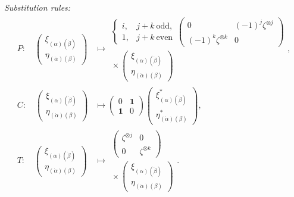 \emph{Substitution rules:}
\begin{equation}
\begin{aligned}
  \scriptstyle
  P:\quad
  \begin{pmatrix}
    \xi_{(\alpha)(\dot\beta)}\\
    \eta_{(\dot\alpha)(\beta)}
  \end{pmatrix}
  &\longmapsto
  \begin{gathered}
    \begin{cases}
      i,&j+k\ \text{odd},\\
      1,&j+k\ \text{even}
    \end{cases}
    \begin{pmatrix}
      0&(-1)^j\zeta^{\otimes j}\\
      (-1)^k\zeta^{\otimes k}&0
    \end{pmatrix}\\[-2pt]
    {}\times
    \begin{pmatrix}
      \xi_{(\alpha)(\dot\beta)}\\
      \eta_{(\dot\alpha)(\beta)}
    \end{pmatrix}
  \end{gathered},\\[6pt]
  C:\quad
  \begin{pmatrix}
    \xi_{(\alpha)(\dot\beta)}\\
    \eta_{(\dot\alpha)(\beta)}
  \end{pmatrix}
  &\longmapsto
  \begin{pmatrix}0&\mathbf{1}\\\mathbf{1}&0\end{pmatrix}
  \begin{pmatrix}
    \xi_{(\alpha)(\dot\beta)}^*\\
    \eta_{(\dot\alpha)(\beta)}^*
  \end{pmatrix},\\[6pt]
  T:\quad
  \begin{pmatrix}
    \xi_{(\alpha)(\dot\beta)}\\
    \eta_{(\dot\alpha)(\beta)}
  \end{pmatrix}
  &\longmapsto
  \begin{gathered}
    \begin{pmatrix}
      \zeta^{\otimes j}&0\\
      0&\zeta^{\otimes k}
    \end{pmatrix}\\[-2pt]
    {}\times
    \begin{pmatrix}
      \xi_{(\alpha)(\dot\beta)}\\
      \eta_{(\dot\alpha)(\beta)}
    \end{pmatrix}
  \end{gathered}.
\end{aligned}
\tag{1-50}\label{eq:ch1-general-spinor-pct-rules}
\end{equation}

